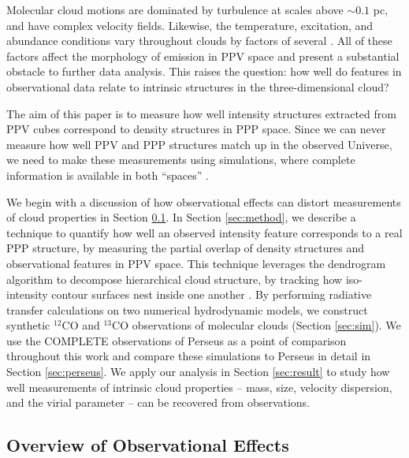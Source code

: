 Molecular cloud motions are dominated by turbulence at scales above $\sim 0.1$ pc, and have complex velocity fields. Likewise, the temperature, excitation, and abundance conditions vary throughout clouds by factors of several \citep{http://adsabs.harvard.edu/abs/2008ApJ...679..481P,  http://adsabs.harvard.edu/abs/2013ApJ...766L..17S} . All of these factors affect the morphology of emission in PPV space and present a substantial obstacle to further data analysis. This raises the question: how well do features in observational data relate to intrinsic structures in the three-dimensional cloud?


The aim of this paper is to measure how well intensity structures extracted from PPV cubes correspond to density structures in PPP space. Since we can never measure how well PPV and PPP structures match up in the observed Universe, we need to make these measurements using simulations, where complete information is available in both ``spaces'' \citep{http://adsabs.harvard.edu/abs/2011IAUS..270..511G}.

We begin with a discussion of how observational effects can distort measurements of cloud properties in Section \ref{sec:overview}. In Section \ref{sec:method}, we describe a technique to quantify how well an observed intensity feature corresponds to a real PPP structure, by measuring the partial overlap of density structures and observational features in PPV space. This technique leverages the dendrogram algorithm to decompose hierarchical cloud structure, by tracking how iso-intensity contour surfaces nest inside one another \citep{http://adsabs.harvard.edu/abs/2008ApJ...679.1338R}. By performing radiative transfer calculations on two numerical hydrodynamic models, we construct synthetic $^{12}$CO and $^{13}$CO observations of molecular clouds (Section \ref{sec:sim}). We use the COMPLETE observations of Perseus as a point of comparison throughout this work \citep{http://adsabs.harvard.edu/abs/2006AJ....131.2921R} and compare these simulations to Perseus in detail in Section \ref{sec:perseus}.
We apply our analysis in Section \ref{sec:result} to study how well measurements of intrinsic cloud properties --  mass, size, velocity dispersion, and the virial parameter -- can be recovered from observations.

\subsection{Overview of Observational Effects}
\label{sec:overview}

